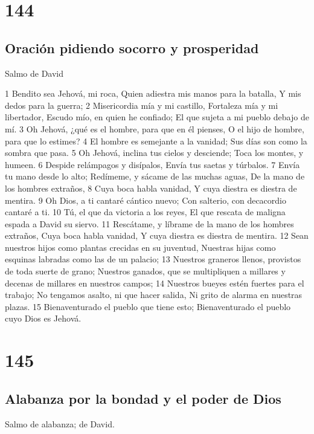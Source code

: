 \chapter{144}

\section*{Oración pidiendo socorro y prosperidad}

Salmo de David

1 Bendito sea Jehová, mi roca,
Quien adiestra mis manos para la batalla,
Y mis dedos para la guerra;
2 Misericordia mía y mi castillo,
Fortaleza mía y mi libertador,
Escudo mío, en quien he confiado;
El que sujeta a mi pueblo debajo de mí.
3 Oh Jehová, ¿qué es el hombre, para que en él pienses,
O el hijo de hombre, para que lo estimes?
4 El hombre es semejante a la vanidad;
Sus días son como la sombra que pasa.
5 Oh Jehová, inclina tus cielos y desciende;
Toca los montes, y humeen.
6 Despide relámpagos y disípalos,
Envía tus saetas y túrbalos.
7 Envía tu mano desde lo alto;
Redímeme, y sácame de las muchas aguas,
De la mano de los hombres extraños,
8 Cuya boca habla vanidad,
Y cuya diestra es diestra de mentira.
9 Oh Dios, a ti cantaré cántico nuevo;
Con salterio, con decacordio cantaré a ti.
10 Tú, el que da victoria a los reyes,
El que rescata de maligna espada a David su siervo.
11 Rescátame, y líbrame de la mano de los hombres extraños,
Cuya boca habla vanidad,
Y cuya diestra es diestra de mentira.
12 Sean nuestros hijos como plantas crecidas en su juventud,
Nuestras hijas como esquinas labradas como las de un palacio;
13 Nuestros graneros llenos, provistos de toda suerte de grano;
Nuestros ganados, que se multipliquen a millares y decenas de millares en nuestros campos;
14 Nuestros bueyes estén fuertes para el trabajo;
No tengamos asalto, ni que hacer salida,
Ni grito de alarma en nuestras plazas.
15 Bienaventurado el pueblo que tiene esto;
Bienaventurado el pueblo cuyo Dios es Jehová.

\chapter{145}

\section*{Alabanza por la bondad y el poder de Dios}

Salmo de alabanza; de David.

